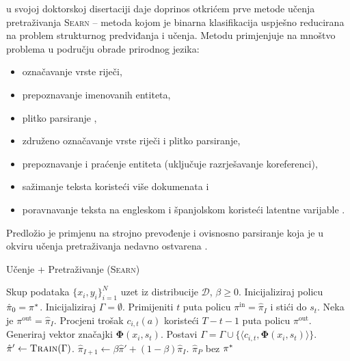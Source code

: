 \citet{daume06thesis} u svojoj doktorskoj disertaciji daje doprinos otkrićem
prve metode učenja pretraživanja \textsc{Searn}  --
metoda kojom je binarna klasifikacija uspješno reducirana na problem strukturnog
predviđanja i učenja.
Metodu primjenjuje na mnoštvo problema u području obrade prirodnog jezika:
\begin{itemize}
  \item označavanje vrste riječi,
  \item prepoznavanje imenovanih entiteta,
  \item plitko parsiranje ,
  \item združeno označavanje vrste riječi i plitko parsiranje,
  \item prepoznavanje i praćenje entiteta (uključuje razrješavanje koreferenci),
  \item sažimanje teksta koristeći više dokumenata i
  \item poravnavanje teksta na engleskom i španjolskom koristeći latentne
  varijable .
\end{itemize}
Predložio je primjenu na strojno prevođenje i ovisnosno parsiranje koja je u
okviru učenja pretraživanja nedavno ostvarena
\citep{he2015syntax,chang2015learning}.

\begin{algorithm}
\caption{Učenje + Pretraživanje (\textsc{Searn})}\label{alg:searn}
\begin{algorithmic}[1]
\Require Skup podataka $\{x_i, y_i\}_{i=1}^N$ uzet iz distribucije $\mathcal{D}$,
  $\beta \geq 0$. %
\State Inicijaliziraj policu $\hat{\pi}_0 = \pi\ssymbol{1}$.
\ForAll{$I \in \big[0,1,2,\ldots,P)$}
    \State Inicijaliziraj $\Gamma = \emptyset$. 
      \State Primijeniti $t$ puta policu $\pi^{\text{in}} = \hat{\pi}_{I}$  i stići do $s_t$. 
      \label{alg:searn:action}
        \State Neka je  $\pi^{\text{out}} = \hat{\pi}_{I}$.\label{alg:searn:rolloutpolicy}
        \State Procjeni trošak $c_{i,t}(a)$ koristeći $T-t-1$ puta policu $\pi^{\text{out}}$. \label{alg:searn:rollout}
      \EndFor
      \State Generiraj vektor značajki $\mathbf{\Phi}(x_i, s_t)$.
      \State Postavi $\Gamma = \Gamma \cup \{\langle c_{i,t}, \mathbf{\Phi}(x_i, s_t) \rangle\}$.
    \EndFor
  \EndFor
  \State $\hat{\pi}' \gets \textsc{Train}(\Gamma)$.\label{alg:searn:train}
  \State $\hat{\pi}_{I+1} \gets \beta \hat{\pi}' + (1-\beta) \hat{\pi}_{I}$. \label{alg:searn:mixture}
\EndFor
\State \Return $\hat{\pi}_{P}$ bez $\pi\ssymbol{1}$
\end{algorithmic}
\end{algorithm}

